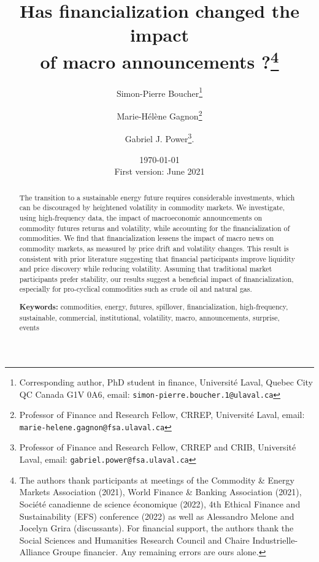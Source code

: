 \documentclass[12pt]{article}
\title{\textbf{Has financialization changed the impact\\ of macro announcements ?}\thanks{The authors thank participants at meetings of the Commodity \& Energy Markets Association (2021),  World Finance \& Banking Association (2021), Société canadienne de science  économique (2022), 4th Ethical Finance and Sustainability (EFS) conference (2022) as well as Alessandro Melone and Jocelyn Grira (discussants). For financial support, the authors thank the Social Sciences and Humanities Research Council and Chaire Industrielle-Alliance Groupe financier. Any remaining errors are ours alone.}}
\author{Simon-Pierre Boucher\footnote{Corresponding author, PhD student in finance, Université Laval, Quebec City QC Canada G1V 0A6, email:   \texttt{simon-pierre.boucher.1@ulaval.ca}}\and Marie-H{\'e}l{\`e}ne Gagnon\footnote{Professor of Finance and Research Fellow, CRREP, Université Laval, email: \texttt{marie-helene.gagnon@fsa.ulaval.ca}}\and Gabriel J. Power\footnote{Professor of Finance and Research Fellow, CRREP and CRIB, Université Laval, email:   \texttt{gabriel.power@fsa.ulaval.ca}}. 
}
\date{ \today \\ First version: June 2021}
\begin{document}
\begin{titlepage}
\maketitle





\begin{abstract}
\noindent 
\singlespacing
The transition to a sustainable energy future requires considerable investments, which can be discouraged by heightened volatility in commodity markets.
 We investigate, using high-frequency data, the impact of macroeconomic announcements on commodity futures returns and volatility, while accounting for the financialization of commodities. We find that financialization lessens the impact of macro news on commodity markets, as measured by price drift and volatility changes. This result is consistent with prior literature suggesting that financial participants improve liquidity and price discovery while reducing volatility. Assuming that traditional market participants prefer stability, our results suggest a beneficial impact of financialization, especially for pro-cyclical commodities such as crude oil and natural gas.

\vspace{0.2in}
\noindent\textbf{Keywords:} commodities, energy, futures,  spillover, financialization, high-frequency, sustainable, commercial, institutional, volatility, macro, announcements, surprise, events\\


\bigskip
\end{abstract}
\setcounter{page}{0}
\thispagestyle{empty}
\end{titlepage}
\pagebreak \newpage




\doublespacing
\end{document}
